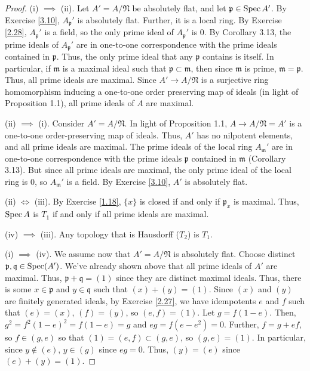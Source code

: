\begin{proof}
(i) $\implies$ (ii). Let $A' = A/\mathfrak{N}$ be absolutely flat, and let $\mathfrak{p} \in \operatorname{Spec} A'$. By Exercise \ref{3.10}, $A_{\mathfrak{p}}'$ is absolutely flat. 
Further, it is a local ring. By Exercise \ref{2.28}, $A_{\mathfrak{p}}'$ is a field, so the only prime ideal of $A_{\mathfrak{p}}'$ is $0$. By Corollary 3.13, the prime ideals of $A_{\mathfrak{p}}'$
are in one-to-one correspondence with the prime ideals contained in $\mathfrak{p}$. Thus, the only prime ideal that any $\mathfrak{p}$ contains is itself. In particular, if $\mathfrak{m}$ is a maximal 
ideal such that $\mathfrak{p} \subset \mathfrak{m}$, then since $\mathfrak{m}$ is prime, $\mathfrak{m} = \mathfrak{p}$. Thus, all prime ideals are maximal. Since $A' \to A/\mathfrak{N}$ is a surjective 
ring homomorphism inducing a one-to-one order preserving map of ideals (in light of Proposition 1.1), all prime ideals of $A$ are maximal.

(ii) $\implies$ (i). Consider $A' = A/\mathfrak{N}$. In light of Proposition 1.1, $A \to A/\mathfrak{N} = A'$ is a one-to-one order-preserving map of ideals. Thus, $A'$ has no nilpotent elements, and
all prime ideals are maximal. The prime ideals of the local ring $A_{\mathfrak{m}}'$ are in one-to-one correspondence with the prime ideals $\mathfrak{p}$ contained in $\mathfrak{m}$ (Corollary 3.13). 
But since all prime ideals are maximal, the only prime ideal of the local ring is $0$, so $A_{\mathfrak{m}}'$ is a field. By Exercise \ref{3.10}, $A'$ is absolutely flat.

(ii) $\iff$ (iii). By Exercise \ref{1.18}, $\{x\}$ is closed if and only if $\mathfrak{p}_x$ is maximal. Thus, $\operatorname{Spec} A$ is $T_1$ if and only if all prime ideals are maximal.

(iv) $\implies$ (iii). Any topology that is Hausdorff ($T_2$) is $T_1$.

(i) $\implies$ (iv). We assume now that $A' = A/\mathfrak{N}$ is absolutely flat. Choose distinct $\mathfrak{p},\mathfrak{q} \in \operatorname{Spec}(A')$. We've already shown above that all prime ideals of $A'$ are maximal.
Thus, $\mathfrak{p} + \mathfrak{q} = (1)$ since they are distinct maximal ideals. Thus, there is some $x \in \mathfrak{p}$ and $y \in \mathfrak{q}$ such that $(x) + (y) = (1)$. Since $(x)$ and $(y)$ are finitely
generated ideals, by Exercise \ref{2.27}, we have idempotents $e$ and $f$ such that $(e) = (x)$, $(f) = (y)$, so $(e,f) = (1)$. Let $g = f(1-e)$. Then, $g^2 = f^2(1-e)^2 = f(1-e) = g$ and $eg = f(e-e^2) = 0$. 
Further, $f = g + ef$, so $f \in (g,e)$ so that $(1) = (e,f) \subset (g,e)$, so $(g,e) = (1)$. In particular, since $y \not\in (e)$, $y \in (g)$ since $eg = 0$. Thus, $(y) = (e)$ since $(e) + (y) = (1)$.


\end{proof}
